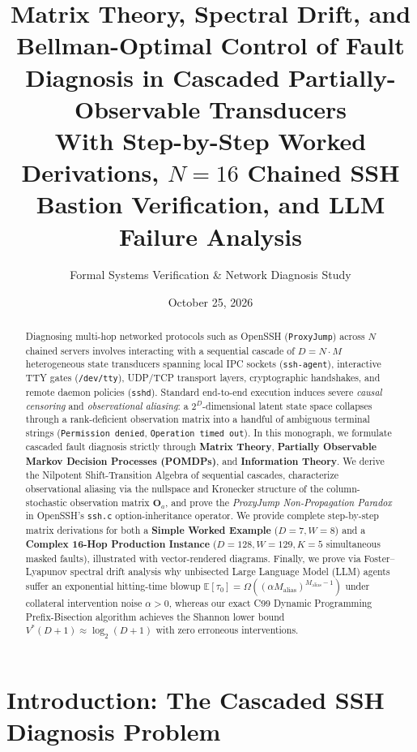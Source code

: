 \documentclass[11pt,a4paper]{article}
\title{\textbf{Matrix Theory, Spectral Drift, and Bellman-Optimal Control of Fault Diagnosis in Cascaded Partially-Observable Transducers}\\[0.4em]
\large With Step-by-Step Worked Derivations, $N=16$ Chained SSH Bastion Verification, and LLM Failure Analysis}
\author{Formal Systems Verification \& Network Diagnosis Study}
\date{October 25, 2026}
\theoremstyle{definition}
\theoremstyle{remark}
\begin{document}
\maketitle

\begin{abstract}
Diagnosing multi-hop networked protocols such as OpenSSH (\texttt{ProxyJump}) across $N$ chained servers involves interacting with a sequential cascade of $D = N \cdot M$ heterogeneous state transducers spanning local IPC sockets (\texttt{ssh-agent}), interactive TTY gates (\texttt{/dev/tty}), UDP/TCP transport layers, cryptographic handshakes, and remote daemon policies (\texttt{sshd}). Standard end-to-end execution induces severe \emph{causal censoring} and \emph{observational aliasing}: a $2^D$-dimensional latent state space collapses through a rank-deficient observation matrix into a handful of ambiguous terminal strings (\texttt{Permission denied}, \texttt{Operation timed out}). In this monograph, we formulate cascaded fault diagnosis strictly through \textbf{Matrix Theory}, \textbf{Partially Observable Markov Decision Processes (POMDPs)}, and \textbf{Information Theory}. We derive the Nilpotent Shift-Transition Algebra of sequential cascades, characterize observational aliasing via the nullspace and Kronecker structure of the column-stochastic observation matrix $\mathbf{O}_a$, and prove the \emph{ProxyJump Non-Propagation Paradox} in OpenSSH's \texttt{ssh.c} option-inheritance operator. We provide complete step-by-step matrix derivations for both a \textbf{Simple Worked Example} ($D=7, W=8$) and a \textbf{Complex 16-Hop Production Instance} ($D=128, W=129, K=5$ simultaneous masked faults), illustrated with vector-rendered diagrams. Finally, we prove via Foster--Lyapunov spectral drift analysis why unbisected Large Language Model (LLM) agents suffer an exponential hitting-time blowup $\mathbb{E}[\tau_0] = \Omega((\alpha M_{\text{alias}})^{M_{\text{alias}}-1})$ under collateral intervention noise $\alpha > 0$, whereas our exact C99 Dynamic Programming Prefix-Bisection algorithm achieves the Shannon lower bound $V^*(D+1) \approx \log_2(D+1)$ with zero erroneous interventions.
\end{abstract}

\tableofcontents
\newpage

\section{Introduction: The Cascaded SSH Diagnosis Problem}
\end{document}
